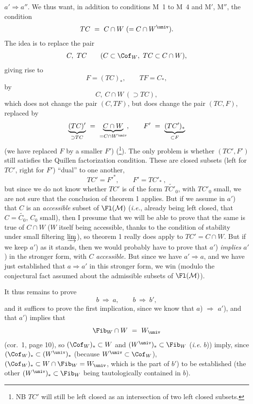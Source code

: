 $a' \Longrightarrow a''$. We thus want, in addition to conditions M~1 to M~4 and M$'$, M$''$, the condition
\[ TC \ =\ C \cap W\ (= C \cap W^{\univ}). \]
The idea is to replace the pair
\[ C,\ TC \qquad (C \subset \Cof_W,\ TC \subset C \cap W), \]
giving rise to
\[ F = (TC)_*, \qquad TF = C_*, \]
by
\[ C,\ C \cap W\ (\supset TC), \]
which does not change the pair $(C, TF)$, but does change the pair $(TC, F)$, replaced by
\[ \underbrace{(TC)'}_{\supset TC} \ =\ \underbrace{C \cap W}_{= C\cap W^{\univ}}, \qquad F' \ =\ \underbrace{(TC')_*}_{\subset F} \]
(we have replaced $F$ by a smaller $F'$) (\footnote[14]{NB $TC'$ will still be left closed as an intersection of two left closed subsets.}). The only problem is whether $(TC', F')$ still satisfies the Quillen factorization condition. These are closed subsets (left for $TC'$, right for $F'$) ``dual'' to one another,
\[ TC' = F'^*, \qquad F' = TC'_* \ , \]
but since we do not know whether $TC'$ is of the form $\widetilde{TC'_0}$, with $TC'_0$ small, we are not sure that the conclusion of theorem 1 applies. But if we assume in $a'$) that $C$ is an \textit{accessible} subset of $\Fl(\mathcal{M})$ (\textit{i.e.}, already being left closed, that $C = \widetilde{C_0}$, $C_0$ small),
then I presume that we will be able to prove that the same is true of $C \cap W$ ($W$ itself being accessible, thanks to the condition of stability under small filtering $\varinjlim$), so theorem 1 really does apply to $TC' = C \cap W$. But if we keep $a'$) as it stands, then we would probably have to prove that $a'$) \textit{implies} $a'$) in the stronger form, with $C$ \textit{accessible.} But since we have $a' \Longrightarrow a$, and we have just established that $a \Longrightarrow a'$ in this stronger form, we win (modulo the conjectural fact assumed about the admissible subsets of $\Fl(\mathcal{M})$).

It thus remains to prove
\[ b \ \Longrightarrow\ a, \qquad b \ \Longrightarrow\ b', \]
and it suffices to prove the first implication, since we know that $a$) $\Longrightarrow$ $a'$), and that $a'$) implies that
\[ \Fib_W \cap W \ =\ W_{\univ} \]
(cor.~1, page 10), so $(\Cof_W)_* \subset W$ and $(W^{\univ})_* \subset \Fib_W$ (\textit{i.e.} $b$)) imply, since $(\Cof_W)_* \subset (W^{\univ})_*$ (because $W^{\univ} \subset \Cof_W$), $(\Cof_W)_* \subset W \cap \Fib_W = W_{\univ}$, which is the part of $b'$) to be established (the other $(W^{\univ})_* \subset \Fib_W$ being tautologically contained in $b$).


